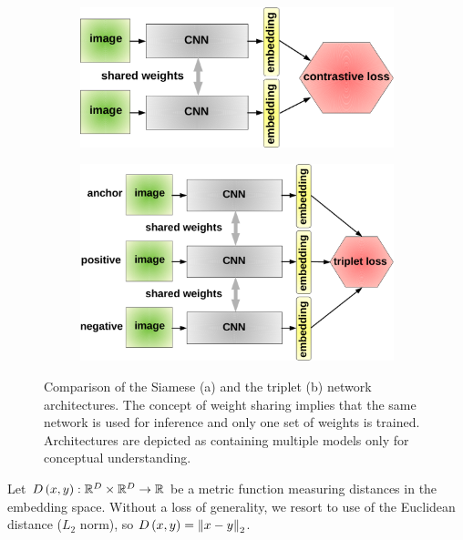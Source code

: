 \begin{figure}[t]
    \centering
    \begin{subfigure}[b]{0.49\textwidth}
        \centering
        \includegraphics[width=\textwidth]{figures/theoretical_foundations/siamese_architecture.pdf}
        \caption[]{}
    \end{subfigure}
    \hfill
    \begin{subfigure}[b]{0.49\textwidth}
        \centering
        \includegraphics[width=\textwidth]{figures/theoretical_foundations/triplet_architecture.pdf}
        \caption[]{}
    \end{subfigure}
    \caption[Contrastive and triplet loss]{Comparison of the Siamese (a) and the triplet (b) network architectures. The concept of weight sharing implies that the same network is used for inference and only one set of weights is trained. Architectures are depicted as containing multiple models only for conceptual understanding.}
    \label{fig:SiameseAndTripletArchitectures}
\end{figure}

Let ${D} \left( x, y \right): \mathbb{R}^D \times \mathbb{R}^D \to \mathbb{R}$ be a metric function measuring distances in the embedding space. Without a loss of generality, we resort to use of the Euclidean distance ($L_2$ norm), so ${D} \left( x, y \right) = {\left\Vert {x - y} \right\Vert}_2$.

